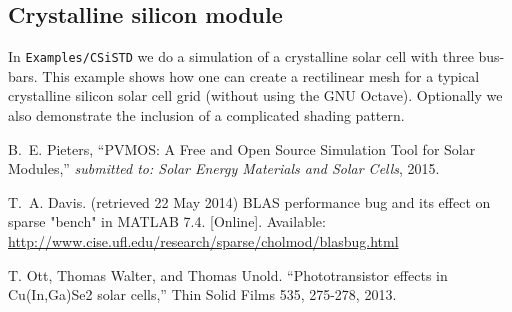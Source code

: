 \documentclass[noshowpacs,preprintnumbers,amsmath,amssymb, letter]{revtex4}
\begin{document}
\subsection{Crystalline silicon module}
In \texttt{Examples/CSiSTD} we do a simulation of a crystalline solar cell with three bus-bars. This example shows how one can create a rectilinear mesh for a typical crystalline silicon solar cell grid (without using the GNU Octave). Optionally we also demonstrate the inclusion of a complicated shading pattern. 
\begin{thebibliography}{10}

B.~E. Pieters, ``{PVMOS: A Free and Open Source Simulation Tool for Solar Modules},'' \emph{submitted to: Solar Energy Materials and Solar Cells}, 2015.

T.~A. Davis. (retrieved 22 May 2014) {BLAS performance bug and its effect on
  sparse "bench" in MATLAB 7.4}. [Online]. Available:
  \url{http://www.cise.ufl.edu/research/sparse/cholmod/blasbug.html}

T. Ott, Thomas Walter, and Thomas Unold. ``{Phototransistor effects in Cu(In,Ga)Se2 solar cells},'' Thin Solid Films 535, 275-278, 2013.

\end{thebibliography}
\end{document}
